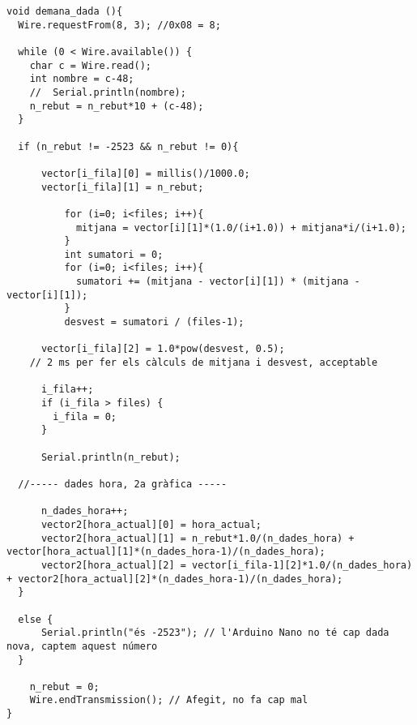 \begin{spacing}{1}
\begin{lstlisting}[style=myArduino]
void demana_dada (){
  Wire.requestFrom(8, 3); //0x08 = 8;

  while (0 < Wire.available()) {
    char c = Wire.read(); 
    int nombre = c-48; 
    //  Serial.println(nombre);
    n_rebut = n_rebut*10 + (c-48);
  }

  if (n_rebut != -2523 && n_rebut != 0){
  
      vector[i_fila][0] = millis()/1000.0;
      vector[i_fila][1] = n_rebut;
      
          for (i=0; i<files; i++){
            mitjana = vector[i][1]*(1.0/(i+1.0)) + mitjana*i/(i+1.0);  
          }
          int sumatori = 0;
          for (i=0; i<files; i++){
            sumatori += (mitjana - vector[i][1]) * (mitjana - vector[i][1]);  
          }
          desvest = sumatori / (files-1);
  
      vector[i_fila][2] = 1.0*pow(desvest, 0.5);
    // 2 ms per fer els càlculs de mitjana i desvest, acceptable  
          
      i_fila++;
      if (i_fila > files) {
        i_fila = 0;
      }
   
      Serial.println(n_rebut);  
  
  //----- dades hora, 2a gràfica -----
  
      n_dades_hora++;
      vector2[hora_actual][0] = hora_actual;
      vector2[hora_actual][1] = n_rebut*1.0/(n_dades_hora) + vector[hora_actual][1]*(n_dades_hora-1)/(n_dades_hora);
      vector2[hora_actual][2] = vector[i_fila-1][2]*1.0/(n_dades_hora) + vector2[hora_actual][2]*(n_dades_hora-1)/(n_dades_hora);
  }
    
  else {
      Serial.println("és -2523"); // l'Arduino Nano no té cap dada nova, captem aquest número
  }

    n_rebut = 0;
    Wire.endTransmission(); // Afegit, no fa cap mal
}
\end{lstlisting}
\end{spacing}
